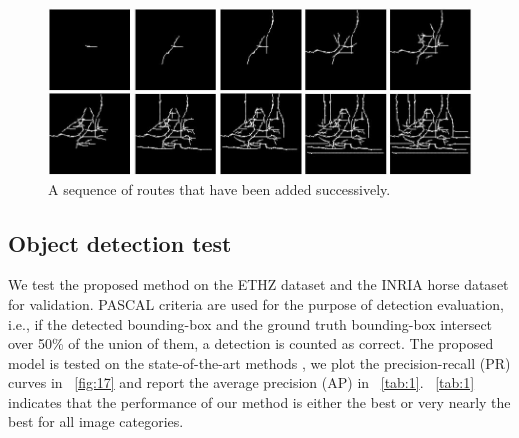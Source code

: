 \documentclass{article}
\begin{document}
\begin{figure}[!t]
\centering
\includegraphics[width=0.8\linewidth]{images/fig20.jpg}
\caption{A sequence of routes that have been added successively.}
\label{fig:20}
\end{figure}

\subsection{Object detection test}

We test the proposed method on the ETHZ dataset and the INRIA horse dataset for validation.
PASCAL criteria are used for the purpose of detection evaluation, 
i.e., if the detected bounding-box and the ground truth bounding-box intersect over 50\%{} of the union of them, 
a detection is counted as correct.
The proposed model is tested on the state-of-the-art methods 
\cite{lu2009,felzenszwalb2007,maji2009,srinivasan2010,wang2012,lin2012},
we plot the precision-recall (PR) curves in \figurename~\ref{fig:17} 
and report the average precision (AP) in \tablename~\ref{tab:1}.
\tablename~\ref{tab:1} indicates that the performance of our method is either the best or very nearly the best for all image categories.
 
\end{document}
